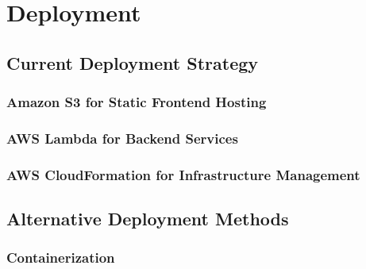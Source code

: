 \chapter{Deployment}
\label{chap:deployment}
\section{Current Deployment Strategy}
\label{sec:current-deployment-strategy}

\subsection{Amazon S3 for Static Frontend Hosting}
\label{subsec:amazon-s3-static-frontend}

\subsection{AWS Lambda for Backend Services}
\label{subsec:aws-lambda-backend}

\subsection{AWS CloudFormation for Infrastructure Management}
\label{subsec:aws-cloudformation-infrastructure}

\section{Alternative Deployment Methods}
\label{sec:alternative-deployment-methods}

\subsection{Containerization}
\label{subsec:containerization}

